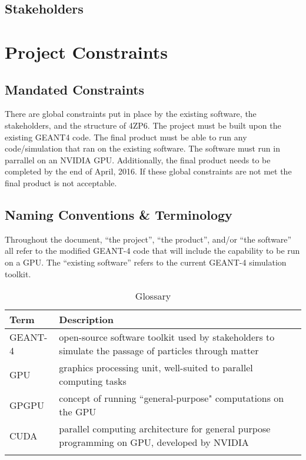 \documentclass[12pt]{article}
\begin{document}
\subsection{Stakeholders} %

\section{Project Constraints}

\subsection{Mandated Constraints} %
There are global constraints put in place by the existing software, the stakeholders, and the structure of 4ZP6. The project must be built upon the existing GEANT4 code. The final product must be able to run any code/simulation that ran on the existing software. The software must run in parrallel on an NVIDIA GPU. Additionally, the final product needs to be completed by the end of April, 2016. If these global constraints are not met the final product is not acceptable.\\

\subsection{Naming Conventions \& Terminology} %
Throughout the document, ``the project'', ``the product'', and/or ``the software'' all refer to the modified GEANT-4 code that will include the capability to be run on a GPU. The ``existing software'' refers to the current GEANT-4 simulation toolkit.\\
\begin{table}[h]
\centering
\caption{Glossary}
\begin{tabularx}{\textwidth}{l|X}
\Xhline{2\arrayrulewidth}
\bf Term & \bf Description\\
\hline
GEANT-4 & open-source software toolkit used by stakeholders to simulate the passage of particles through matter\\
GPU & graphics processing unit, well-suited to parallel computing tasks\\
GPGPU & concept of running ``general-purpose" computations on the GPU\\
CUDA & parallel computing architecture for general purpose programming on GPU, developed by NVIDIA\\
\Xhline{2\arrayrulewidth}
\end{tabularx}
\end{table}
\end{document}

